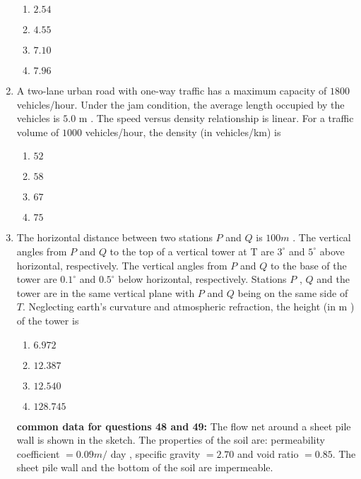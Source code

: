 \documentclass[journal]{IEEEtran}
\begin{document}
\begin{enumerate}
\begin{enumerate}
			\item $2.54$
			\item $4.55$
			\item $7.10$ 
			\item $7.96$ 
        	\end{enumerate}
	\item A two-lane urban road with one-way traffic has a maximum capacity of $1800$ vehicles/hour. Under the jam condition, the average length occupied by the vehicles is $5.0$ m . The speed versus density relationship is linear. For a traffic volume of $1000$ vehicles/hour, the density (in vehicles/km) is
		\begin{enumerate}
		       \item $52$
		       \item $58$
		       \item $67$
		       \item $75$
        	\end{enumerate}	
	\item The horizontal distance between two stations $P$ and $Q$ is $100 m$ . The vertical angles from $P$ and $Q$ to the top of a vertical tower at T are $3^{\circ}$ and $5^{\circ}$ above horizontal, respectively. The vertical angles from $P$ and $Q$ to the base of the tower are $0.1^{\circ}$ and $0.5^{\circ}$ below horizontal, respectively. Stations $P$ , $Q$ and the tower are in the same vertical plane with $P$ and $Q$ being on the same side of $T$. Neglecting earth's curvature and atmospheric refraction, the height (in m ) of the tower is
		\begin{enumerate}
			\item $6.972$
            \item $12.387$
            \item $12.540$
            \item $128.745$
        	\end{enumerate}	
    \textbf{common data for questions 48 and 49:}
    The flow net around a sheet pile wall is shown in the sketch. The properties of the soil are: permeability coefficient $=0.09 m /$ day , specific gravity $=2.70$ and void ratio $=0.85$. The sheet pile wall and the bottom of the soil are impermeable.

    

\end{enumerate}
\end{document}
